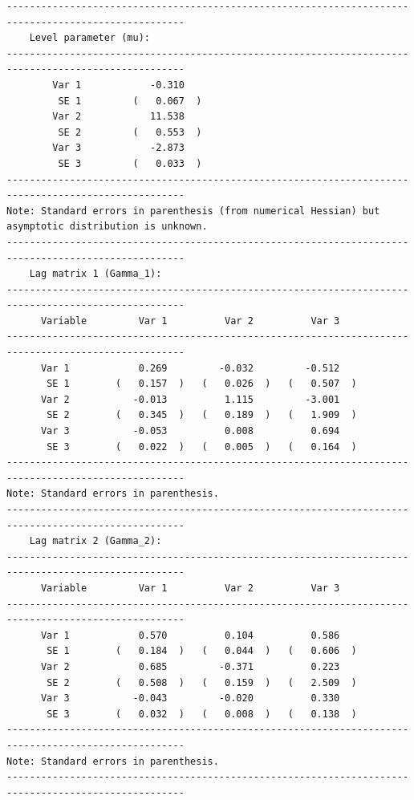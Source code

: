 \documentclass[article]{jss}
\begin{document}
\begin{verbatim}
-----------------------------------------------------------------------------------------------------
    Level parameter (mu):                                                                         
-----------------------------------------------------------------------------------------------------
        Var 1            -0.310     
         SE 1         (   0.067  )  
        Var 2            11.538     
         SE 2         (   0.553  )  
        Var 3            -2.873     
         SE 3         (   0.033  )  
-----------------------------------------------------------------------------------------------------
Note: Standard errors in parenthesis (from numerical Hessian) but asymptotic distribution is unknown. 
-----------------------------------------------------------------------------------------------------
    Lag matrix 1 (Gamma_1):                                                                            
-----------------------------------------------------------------------------------------------------
      Variable         Var 1          Var 2          Var 3   
-----------------------------------------------------------------------------------------------------
      Var 1            0.269         -0.032         -0.512    
       SE 1        (   0.157  )   (   0.026  )   (   0.507  )  
      Var 2           -0.013          1.115         -3.001    
       SE 2        (   0.345  )   (   0.189  )   (   1.909  )  
      Var 3           -0.053          0.008          0.694    
       SE 3        (   0.022  )   (   0.005  )   (   0.164  )  
-----------------------------------------------------------------------------------------------------
Note: Standard errors in parenthesis.                                                                
-----------------------------------------------------------------------------------------------------
    Lag matrix 2 (Gamma_2):                                                                            
-----------------------------------------------------------------------------------------------------
      Variable         Var 1          Var 2          Var 3   
-----------------------------------------------------------------------------------------------------
      Var 1            0.570          0.104          0.586    
       SE 1        (   0.184  )   (   0.044  )   (   0.606  )  
      Var 2            0.685         -0.371          0.223    
       SE 2        (   0.508  )   (   0.159  )   (   2.509  )  
      Var 3           -0.043         -0.020          0.330    
       SE 3        (   0.032  )   (   0.008  )   (   0.138  )  
-----------------------------------------------------------------------------------------------------
Note: Standard errors in parenthesis.                                                                
-----------------------------------------------------------------------------------------------------


\end{verbatim}
\end{document}

